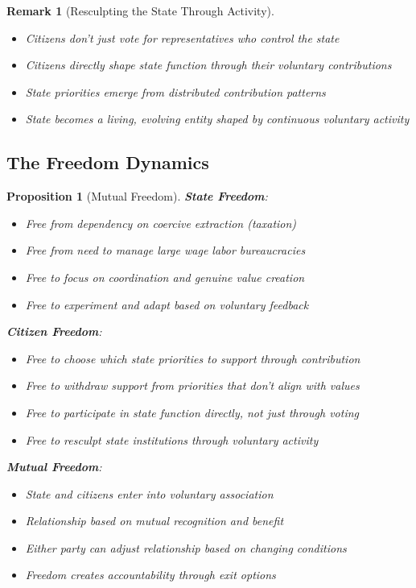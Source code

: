 \documentclass[11pt]{article}
\newtheorem{proposition}{Proposition}
\newtheorem{remark}{Remark}
\begin{document}
\begin{remark}[Resculpting the State Through Activity]
\begin{itemize}
\item Citizens don't just vote for representatives who control the state
\item Citizens directly shape state function through their voluntary contributions
\item State priorities emerge from distributed contribution patterns
\item State becomes a living, evolving entity shaped by continuous voluntary activity
\end{itemize}
\end{remark}

\subsection{The Freedom Dynamics}

\begin{proposition}[Mutual Freedom]
\textbf{State Freedom}:
\begin{itemize}
\item Free from dependency on coercive extraction (taxation)
\item Free from need to manage large wage labor bureaucracies
\item Free to focus on coordination and genuine value creation
\item Free to experiment and adapt based on voluntary feedback
\end{itemize}

\textbf{Citizen Freedom}:
\begin{itemize}
\item Free to choose which state priorities to support through contribution
\item Free to withdraw support from priorities that don't align with values
\item Free to participate in state function directly, not just through voting
\item Free to resculpt state institutions through voluntary activity
\end{itemize}

\textbf{Mutual Freedom}:
\begin{itemize}
\item State and citizens enter into voluntary association
\item Relationship based on mutual recognition and benefit
\item Either party can adjust relationship based on changing conditions
\item Freedom creates accountability through exit options
\end{itemize}
\end{proposition}
\end{document}
